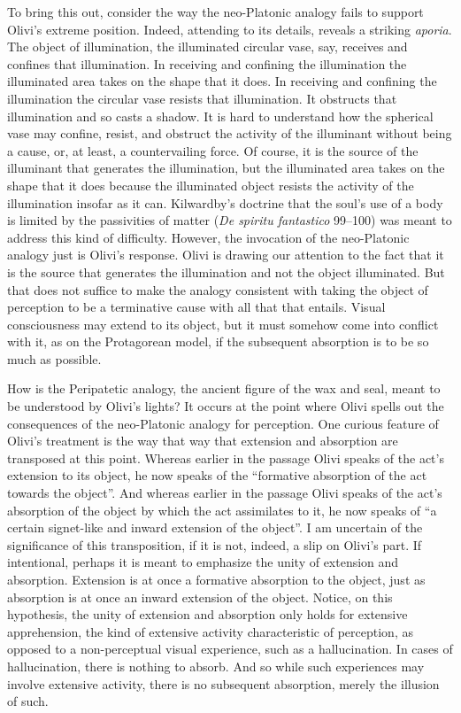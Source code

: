 To bring this out, consider the way the neo-Platonic analogy fails to support Olivi's extreme position. Indeed, attending to its details, reveals a striking \emph{aporia}. The object of illumination, the illuminated circular vase, say, receives and confines that illumination. In receiving and confining the illumination the illuminated area takes on the shape that it does. In receiving and confining the illumination the circular vase resists that illumination. It obstructs that illumination and so casts a shadow. It is hard to understand how the spherical vase may confine, resist, and obstruct the activity of the illuminant without being a cause, or, at least, a countervailing force. Of course, it is the source of the illuminant that generates the illumination, but the illuminated area takes on the shape that it does because the illuminated object resists the activity of the illumination insofar as it can. Kilwardby's doctrine that the soul's use of a body is limited by the passivities of matter (\emph{De spiritu fantastico} 99–100) was meant to address this kind of difficulty. However, the invocation of the neo-Platonic analogy just is Olivi's response. Olivi is drawing our attention to the fact that it is the source that generates the illumination and not the object illuminated. But that does not suffice to make the analogy consistent with taking the object of perception to be a terminative cause with all that that entails. Visual consciousness may extend to its object, but it must somehow come into conflict with it, as on the Protagorean model, if the subsequent absorption is to be so much as possible. 

How is the Peripatetic analogy, the ancient figure of the wax and seal, meant to be understood by Olivi's lights? It occurs at the point where Olivi spells out the consequences of the neo-Platonic analogy for perception. One curious feature of Olivi's treatment is the way that way that extension and absorption are transposed at this point. Whereas earlier in the passage Olivi speaks of the act's extension to its object, he now speaks of the ``formative absorption of the act towards the object''. And whereas earlier in the passage Olivi speaks of the act's absorption of the object by which the act assimilates to it, he now speaks of ``a certain signet-like and inward extension of the object''. I am uncertain of the significance of this transposition, if it is not, indeed, a slip on Olivi's part. If intentional, perhaps it is meant to emphasize the unity of extension and absorption. Extension is at once a formative absorption to the object, just as absorption is at once an inward extension of the object. Notice, on this hypothesis, the unity of extension and absorption only holds for extensive apprehension, the kind of extensive activity characteristic of perception, as opposed to a non-perceptual visual experience, such as a hallucination. In cases of hallucination, there is nothing to absorb. And so while such experiences may involve extensive activity, there is no subsequent absorption, merely the illusion of such.

